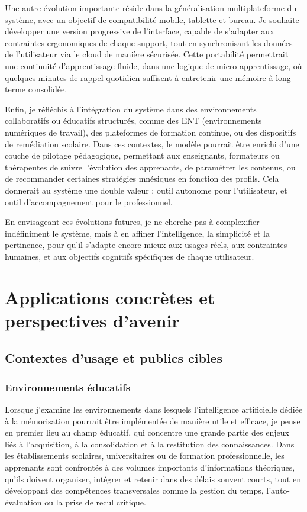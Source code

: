 \documentclass[11pt,a4paper]{report}
\begin{document}
Une autre évolution importante réside dans la généralisation multiplateforme du système, avec un objectif de compatibilité mobile, tablette et bureau. Je souhaite développer une version progressive de l’interface, capable de s’adapter aux contraintes ergonomiques de chaque support, tout en synchronisant les données de l’utilisateur via le cloud de manière sécurisée. Cette portabilité permettrait une continuité d’apprentissage fluide, dans une logique de micro-apprentissage, où quelques minutes de rappel quotidien suffisent à entretenir une mémoire à long terme consolidée.

Enfin, je réfléchis à l’intégration du système dans des environnements collaboratifs ou éducatifs structurés, comme des ENT (environnements numériques de travail), des plateformes de formation continue, ou des dispositifs de remédiation scolaire. Dans ces contextes, le modèle pourrait être enrichi d’une couche de pilotage pédagogique, permettant aux enseignants, formateurs ou thérapeutes de suivre l’évolution des apprenants, de paramétrer les contenus, ou de recommander certaines stratégies mnésiques en fonction des profils. Cela donnerait au système une double valeur : outil autonome pour l’utilisateur, et outil d’accompagnement pour le professionnel.

En envisageant ces évolutions futures, je ne cherche pas à complexifier indéfiniment le système, mais à en affiner l’intelligence, la simplicité et la pertinence, pour qu’il s’adapte encore mieux aux usages réels, aux contraintes humaines, et aux objectifs cognitifs spécifiques de chaque utilisateur.

\chapter{Applications concrètes et perspectives d’avenir}

\section{Contextes d’usage et publics cibles}

\subsection{Environnements éducatifs}

Lorsque j’examine les environnements dans lesquels l’intelligence artificielle dédiée à la mémorisation pourrait être implémentée de manière utile et efficace, je pense en premier lieu au champ éducatif, qui concentre une grande partie des enjeux liés à l’acquisition, à la consolidation et à la restitution des connaissances. Dans les établissements scolaires, universitaires ou de formation professionnelle, les apprenants sont confrontés à des volumes importants d’informations théoriques, qu’ils doivent organiser, intégrer et retenir dans des délais souvent courts, tout en développant des compétences transversales comme la gestion du temps, l’auto-évaluation ou la prise de recul critique.
\end{document}
